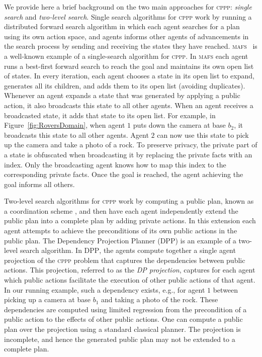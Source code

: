 \documentclass{article}
\newcommand{\cppp}{\textsc {cppp}\xspace}
\newcommand{\mafs}{\textsc {mafs}\xspace}
\newcommand{\dpp}{\textsc {DPP}\xspace}
\theoremstyle{remark}
\newcommand{\citep}[1]{\cite{#1}}
\begin{document}
We provide here a brief background on the two main approaches for \cppp: \emph{single search} and \emph{two-level search}. 
Single search algorithms for \cppp work by running a distributed forward search algorithm 
in which each agent searches for a plan using its own action space, and agents informs other agents of advancements in the search process by sending and receiving the states they have reached. \mafs\ \citep{nissim2014distributed} is a well-known example of a single-search algorithm for \cppp. In \mafs each agent runs a best-first forward search to reach the goal and maintains its own open list of states. In every iteration, each agent chooses a state in its open list to expand, generates all its children, and adds them to its open list (avoiding duplicates). Whenever an agent expands a state that was generated by applying a public action, it also broadcasts this state to all other agents. 
When an agent receives a broadcasted state, it adds that state to its open list. 
For example, in Figure~\ref{fig:RoversDomain}, when agent $1$ puts down the camera at base $b_2$, it broadcasts this state to all other agents. Agent $2$ can now use this state to pick up the camera and take a photo of a rock.
To preserve privacy, the private part of a state is obfuscated when broadcasting it by replacing the private facts with an index. Only the broadcasting agent knows how to map this index to the corresponding private facts. Once the goal is reached, the agent achieving the goal informs all others. 

Two-level search algorithms for \cppp work by computing a public plan, known as a coordination scheme \citep{nissim2014distributed,BrafmanD13,torreno2014fmap}, and then have each agent independently extend the public plan into a complete plan by adding private actions. 
In this extension each agent attempts to achieve the preconditions of its own public actions in the public plan. 
The Dependency Projection Planner (\dpp) \citep{maliah2018action} is an example of a two-level search algorithm. In \dpp, the agents compute together a single agent projection of the \cppp problem that captures the dependencies between public actions. 
This projection, referred to as the \emph{DP projection}, captures for each agent which public actions facilitate the execution of other public actions of that agent. 
In our running example, such a dependency exists, e.g., for agent $1$ between picking up a camera at base $b_1$ and taking a photo of the rock.
These dependencies are computed using limited regression from the precondition of a public action to the effects of other public actions. One can compute a public plan over the projection using a standard classical planner. The projection is incomplete, and hence the generated public plan may not be extended to a complete plan.
\end{document}
